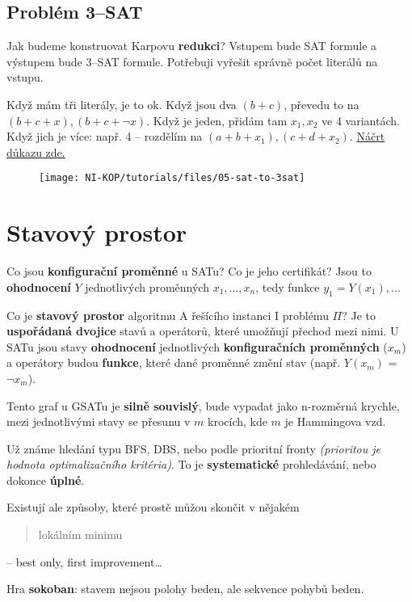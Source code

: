 \subsection{Problém 3--SAT}

Jak budeme konstruovat Karpovu \textbf{redukci}? Vstupem bude SAT formule a výstupem bude 3--SAT formule. Potřebuji vyřešit správně počet literálů na vstupu.

\vspace{4pt}
\noindent Když mám tři literály, je to ok. Když jsou dva $(b+c)$, převedu to na $(b+c+x), (b+c+\lnot{}x)$. Když je jeden, přidám tam $x_1, x_2$ ve 4 variantách. Když jich je více: např. 4 -- rozdělím na $(a+b+x_1), (c+d+x_2)$. \href{https://cse.iitkgp.ac.in/~palash/2018AlgoDesignAnalysis/SAT-3SAT.pdf}{Náčrt důkazu zde.}

\begin{figure}[H]
\centering
\texttt{[image: NI-KOP/tutorials/files/05-sat-to-3sat]}
\end{figure}

\section{Stavový prostor}

Co jsou\textbf{ konfigurační proměnné} u SATu? Co je jeho certifikát? Jsou to \textbf{ohodnocení} $Y$ jednotlivých proměnných $x_1, \ldots, x_n$, tedy funkce $y_1 = Y(x_1), \ldots$

\vspace{4pt}
\noindent Co je \textbf{stavový prostor} algoritmu A řešícího instanci I problému $\Pi$? Je to \textbf{uspořádaná dvojice} stavů a operátorů, které umožňují přechod mezi nimi. U SATu jsou stavy \textbf{ohodnocení} jednotlivých \textbf{konfiguračních proměnných} ($x_m$) a operátory budou \textbf{funkce}, které dané proměnné změní stav (např. $Y(x_m)$ = $\lnot x_m$).

\vspace{4pt}
\noindent Tento graf u GSATu je \textbf{silně souvislý}, bude vypadat jako n-rozměrná krychle, mezi jednotlivými stavy se přesunu v $m$ krocích, kde $m$ je Hammingova vzd.

\vspace{4pt}
\noindent Už známe hledání typu BFS, DBS, nebo podle prioritní fronty \textit{(prioritou je hodnota optimalizačního kritéria)}. To je \textbf{systematické} prohledávání, nebo dokonce \textbf{úplné}.

\vspace{4pt}
\noindent Existují ale způsoby, které prostě můžou skončit v nějakém \blockquote{lokálním minimu} -- best only, first improvement\ldots

\vspace{4pt}
\noindent Hra \textbf{sokoban}: stavem nejsou polohy beden, ale sekvence pohybů beden.
